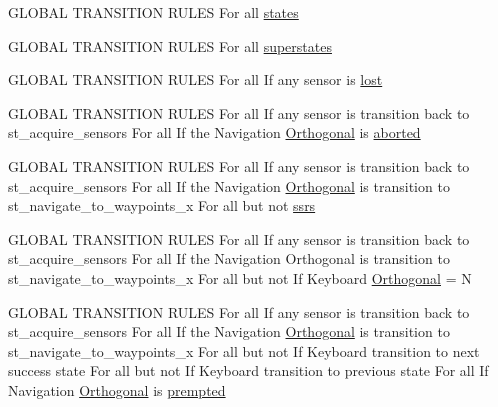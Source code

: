 \begin{DoxyCompactItemize}
\item 
G\+L\+O\+B\+AL T\+R\+A\+N\+S\+I\+T\+I\+ON R\+U\+L\+ES For all \hyperlink{strikes__back_2docs_2Global_01Transition_01Rules_8txt_a54d1602740c77675ed14ebfe688f4374}{states}
\item 
G\+L\+O\+B\+AL T\+R\+A\+N\+S\+I\+T\+I\+ON R\+U\+L\+ES For all \hyperlink{strikes__back_2docs_2Global_01Transition_01Rules_8txt_af31ae27f561335eed0d5161d8ee256f8}{superstates}
\item 
G\+L\+O\+B\+AL T\+R\+A\+N\+S\+I\+T\+I\+ON R\+U\+L\+ES For all If any sensor is \hyperlink{strikes__back_2docs_2Global_01Transition_01Rules_8txt_a21166d43cc40d1ae31189d3fe91d8346}{lost}
\item 
G\+L\+O\+B\+AL T\+R\+A\+N\+S\+I\+T\+I\+ON R\+U\+L\+ES For all If any sensor is transition back to st\+\_\+acquire\+\_\+sensors For all If the Navigation \hyperlink{strikes__back_2docs_2Global_01Transition_01Rules_8txt_a2e1cdec29dad5013e514270d0a78fe22}{Orthogonal} is \hyperlink{strikes__back_2docs_2Global_01Transition_01Rules_8txt_a682ac6cc3cf2eeec69ad3f310ae363ea}{aborted}
\item 
G\+L\+O\+B\+AL T\+R\+A\+N\+S\+I\+T\+I\+ON R\+U\+L\+ES For all If any sensor is transition back to st\+\_\+acquire\+\_\+sensors For all If the Navigation \hyperlink{strikes__back_2docs_2Global_01Transition_01Rules_8txt_a2e1cdec29dad5013e514270d0a78fe22}{Orthogonal} is transition to st\+\_\+navigate\+\_\+to\+\_\+waypoints\+\_\+x For all but not \hyperlink{strikes__back_2docs_2Global_01Transition_01Rules_8txt_aa881c6a22397113c3342bf4c44212934}{ssrs}
\item 
G\+L\+O\+B\+AL T\+R\+A\+N\+S\+I\+T\+I\+ON R\+U\+L\+ES For all If any sensor is transition back to st\+\_\+acquire\+\_\+sensors For all If the Navigation Orthogonal is transition to st\+\_\+navigate\+\_\+to\+\_\+waypoints\+\_\+x For all but not If Keyboard \hyperlink{strikes__back_2docs_2Global_01Transition_01Rules_8txt_a2e1cdec29dad5013e514270d0a78fe22}{Orthogonal} = N
\item 
G\+L\+O\+B\+AL T\+R\+A\+N\+S\+I\+T\+I\+ON R\+U\+L\+ES For all If any sensor is transition back to st\+\_\+acquire\+\_\+sensors For all If the Navigation \hyperlink{strikes__back_2docs_2Global_01Transition_01Rules_8txt_a2e1cdec29dad5013e514270d0a78fe22}{Orthogonal} is transition to st\+\_\+navigate\+\_\+to\+\_\+waypoints\+\_\+x For all but not If Keyboard transition to next success state For all but not If Keyboard transition to previous state For all If Navigation \hyperlink{strikes__back_2docs_2Global_01Transition_01Rules_8txt_a2e1cdec29dad5013e514270d0a78fe22}{Orthogonal} is \hyperlink{strikes__back_2docs_2Global_01Transition_01Rules_8txt_ac6583c64beac40f27e253c605d5d5b5b}{prempted}
\end{DoxyCompactItemize}


